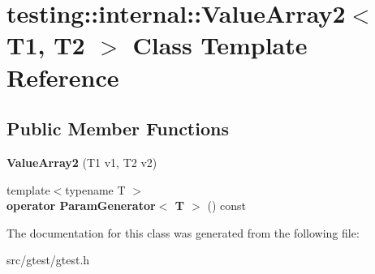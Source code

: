 \hypertarget{classtesting_1_1internal_1_1_value_array2}{}\section{testing\+:\+:internal\+:\+:Value\+Array2$<$ T1, T2 $>$ Class Template Reference}
\label{classtesting_1_1internal_1_1_value_array2}
\subsection*{Public Member Functions}
\begin{DoxyCompactItemize}
\item 
\mbox{\label{classtesting_1_1internal_1_1_value_array2_af641714b9a06929e4dcabe8854d0da1c}} 
{\bfseries Value\+Array2} (T1 v1, T2 v2)
\item 
\mbox{\label{classtesting_1_1internal_1_1_value_array2_aa81899f10bfd345c17aae540acc296a9}} 
{\footnotesize template$<$typename T $>$ }\\{\bfseries operator Param\+Generator$<$ T $>$} () const
\end{DoxyCompactItemize}


The documentation for this class was generated from the following file\+:\begin{DoxyCompactItemize}
\item 
src/gtest/gtest.\+h\end{DoxyCompactItemize}
